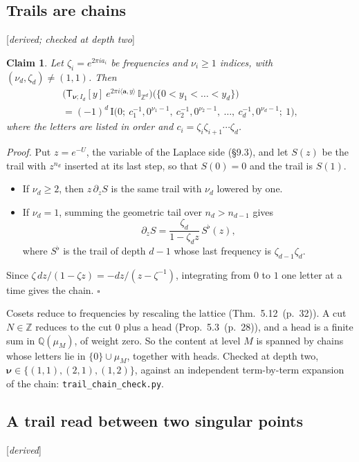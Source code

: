 \documentclass[11pt]{article}
\newcommand{\ip}[2]{\langle #1,#2\rangle}
\newcommand{\sT}{\mathsf T}
\newcommand{\Ilat}[1]{\mathbb I_{#1}}
\newcommand{\status}[1]{\hfill{\small[\textit{#1}]}}
\newcommand{\hb}[2]{#1~(p.~#2)}   %
\theoremstyle{plain}
\newtheorem{claim}{Claim}[section]
\theoremstyle{remark}
\begin{document}
\subsection{Trails are chains}\status{derived; checked at depth two}

\begin{claim}\label{cl:trailchain}
Let $\zeta_i=e^{2\pi ia_i}$ be frequencies and $\nu_i\ge1$ indices, with $(\nu_d,\zeta_d)\neq(1,1)$. Then
\begin{multline*}
\big(\sT_{\boldsymbol\nu;I_d}[y]\ e^{2\pi i\ip{\mathbf a}{y}}\,\Ilat{\mathbb Z^d}\big)\big(\{0<y_1<\dots<y_d\}\big)\\
=(-1)^d\,\mathrm I\big(0;\ c_1^{-1},0^{\nu_1-1},\ c_2^{-1},0^{\nu_2-1},\ \dots,\ c_d^{-1},0^{\nu_d-1};\ 1\big),
\end{multline*}
where the letters are listed in order and $c_i=\zeta_i\zeta_{i+1}\cdots\zeta_d$.
\end{claim}

\emph{Proof.} Put $z=e^{-U}$, the variable of the Laplace side (\S9.3), and let $S(z)$ be the trail with $z^{n_d}$ inserted at its last step, so that $S(0)=0$ and the trail is $S(1)$.
\begin{itemize}
\item If $\nu_d\ge2$, then $z\,\partial_zS$ is the same trail with $\nu_d$ lowered by one.
\item If $\nu_d=1$, summing the geometric tail over $n_d>n_{d-1}$ gives
\[
\partial_zS=\frac{\zeta_d}{1-\zeta_dz}\,S^\flat(z),
\]
where $S^\flat$ is the trail of depth $d-1$ whose last frequency is $\zeta_{d-1}\zeta_d$.
\end{itemize}
Since $\zeta\,dz/(1-\zeta z)=-dz/(z-\zeta^{-1})$, integrating from $0$ to $1$ one letter at a time gives the chain. $\square$

Cosets reduce to frequencies by rescaling the lattice (Thm.~\hb{5.12}{32}). A cut $N\in\mathbb Z$ reduces to the cut $0$ plus a head (Prop.~\hb{5.3}{28}), and a head is a finite sum in $\mathbb Q(\mu_M)$, of weight zero. So the content at level $M$ is spanned by chains whose letters lie in $\{0\}\cup\mu_M$, together with heads. Checked at depth two, $\boldsymbol\nu\in\{(1,1),(2,1),(1,2)\}$, against an independent term-by-term expansion of the chain: \texttt{trail\_chain\_check.py}.

\subsection{A trail read between two singular points}\status{derived}
\end{document}
